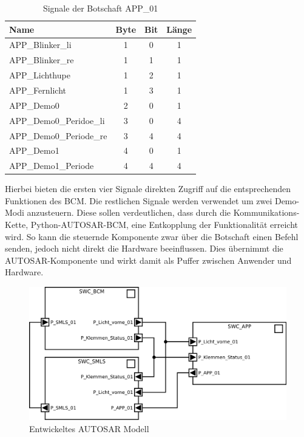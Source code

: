 \documentclass[
  a4paper,					    %
  twoside,
  DIV=calc,     				%
  bibliography=totoc,
  cleardoublepage=empty,
  ngerman,     					%
  final       					%
]{scrbook}
\begin{document}
\begin{table}[ht]
    \centering
    \begin{tabular}[h]{l c c c}
        Name & Byte & Bit & Länge\\
        \toprule
        APP\_Blinker\_li        & 1 &  0  & 1\\
        APP\_Blinker\_re        & 1 &  1  & 1\\
        APP\_Lichthupe          & 1 &  2  & 1\\
        APP\_Fernlicht          & 1 &  3  & 1\\
        APP\_Demo0              & 2 &  0  & 1\\
        APP\_Demo0\_Peridoe\_li & 3 &  0  & 4\\
        APP\_Demo0\_Periode\_re & 3 &  4  & 4\\
        APP\_Demo1              & 4 &  0  & 1\\
        APP\_Demo1\_Periode     & 4 &  4  & 4\\
        \bottomrule
    \end{tabular}
    \caption{Signale der Botschaft APP\_01}
    \label{tab:App_Botschaft}
\end{table}

Hierbei bieten die ersten vier Signale direkten Zugriff auf die entsprechenden Funktionen des BCM. Die restlichen Signale werden verwendet um zwei Demo-Modi anzusteuern. Diese sollen verdeutlichen, dass durch die Kommunikations-Kette, Python-AUTOSAR-BCM, eine Entkopplung der Funktionalität erreicht wird. So kann die steuernde Komponente zwar über die Botschaft einen Befehl senden, jedoch nicht direkt die Hardware beeinflussen. Dies übernimmt die AUTOSAR-Komponente und wirkt damit als Puffer zwischen Anwender und Hardware.

\begin{figure}[ht]
\centering
\includegraphics[width=\textwidth]{SMLS_Modell}
\caption{Entwickeltes AUTOSAR Modell}
\label{fig:smls_modell}
\end{figure}
\end{document}
